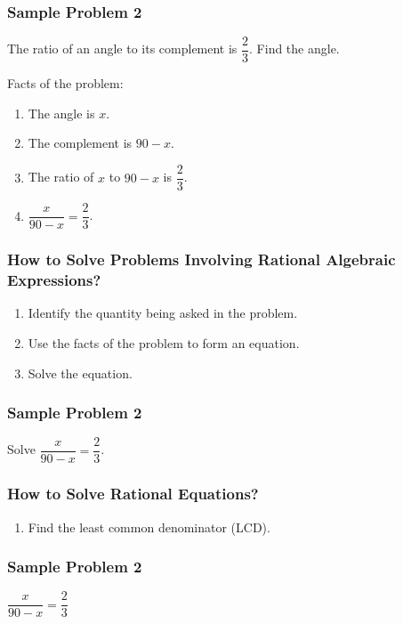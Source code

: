 \documentclass[14pt]{beamer}
\begin{document}
    \begin{frame}
    	\frametitle{Sample Problem 2}
    	The ratio of an angle to its complement is $ \dfrac{2}{3} $. Find the angle.
    	
    	\vone
    	\pause Facts of the problem:
    	\begin{enumerate}
    		\item<3-> The angle is $ x $.
    		\item<4-> The complement is $ 90 - x $.
    		\item<5-> The ratio of $ x $ to $ 90 - x $ is $ \dfrac{2}{3} $.
    		\item<6-> [Then,] $ \dfrac{x}{90 - x} = \dfrac{2}{3} $.
    	\end{enumerate}
    \end{frame}

    \begin{frame}
    	\frametitle{How to Solve Problems Involving Rational Algebraic Expressions?}
    	\begin{enumerate}
    		\item Identify the quantity being asked in the problem.
    		\item Use the facts of the problem to form an equation.
    		\item Solve the equation.
    	\end{enumerate}
    \end{frame}

    \begin{frame}
    	\frametitle{Sample Problem 2}
    	Solve $ \dfrac{x}{90 - x} = \dfrac{2}{3} $.
    \end{frame}

   \begin{frame}
   	\frametitle{How to Solve Rational Equations?}
   	\begin{enumerate}
   		\item Find the least common denominator (LCD).
   	\end{enumerate}
   \end{frame}

    \begin{frame}
    	\frametitle{Sample Problem 2}
    	$ \dfrac{x}{90 - x} = \dfrac{2}{3} $
    	
    \end{frame}
\end{document}
